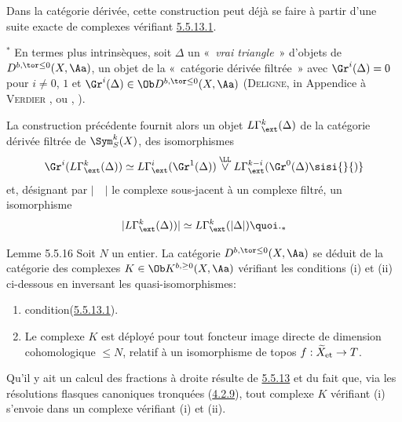 Dans la catégorie dérivée, cette construction peut déjà se faire à
partir d'une suite exacte de complexes vérifiant \hyperref[XVII.par5.5.13.1]{5.5.13.1}.

${}^{\ast}$ En termes plus intrinsèques, soit $\Delta$ un « \emph{vrai triangle} »  d'objets de $D^{b,\tor\leq
0}(X,\Aa)$, \ie un objet de la « catégorie dérivée filtrée » avec $\Gr^{i}(\Delta)=0$ pour $i\neq 0$, $1$ et $\Gr^{i}(\Delta)\in
\Ob D^{b,\tor\leq 0}(X,\Aa)$ (\textsc{Deligne}, in Appendice à \textsc{Verdier}
\cite{V2}, ou , ).

La construction précédente fournit alors un objet
$L\Gamma^{k}_{\ext}(\Delta)$ de la catégorie dérivée filtrée de
$\Sym^{k}_{S}(X)$, des isomorphismes
\[
\Gr^{i}(L\Gamma^{k}_{\ext}(\Delta))\simeq
L\Gamma^{i}_{\ext}(\Gr^{1}(\Delta))\overset{\LL}{\vee}L\Gamma^{k-i}_{\ext}
(\Gr^{0}(\Delta)\sisi{}{)}
\]
et, désignant par $\lvert\quad \rvert$ le complexe sous-jacent à un
complexe filtré, un isomorphisme
\[
\lvert L\Gamma^{k}_{\ext}(\Delta))\rvert \simeq L\Gamma^{k}_{\ext}(\lvert\Delta
\rvert){\quoi}.{}_{\ast}
\]

\begin{enonce*}{Lemme 5.5.16}
Soit $N$ un entier. La catégorie $D^{b,\tor\leq 0}(X,\Aa)$ se
déduit de la catégorie des complexes $K\in \Ob K^{b,\geq
0}(X,\Aa)$ vérifiant les conditions {\rm (i)} et {\rm (ii)}
ci-dessous en inversant les quasi-isomorphismes:
\begin{enumerate}
\renewcommand{\theenumi}{\roman{enumi}}
\renewcommand{\labelenumi}{(\theenumi)}
\item condition\pageoriginale (\hyperref[XVII.par5.5.13.1]{5.5.13.1}).

\item Le complexe $K$ est déployé pour tout foncteur image directe de
dimension cohomologique $\leq N$, relatif à un isomorphisme de topos
$f:\widetilde{X}_{\text{\rm et}}\rightarrow T$.
\end{enumerate}
\end{enonce*}

Qu'il y ait un calcul des fractions à droite résulte de \hyperref[XVII.subsubsec5.5.13]{5.5.13} et du
fait que, via les résolutions flasques canoniques tronquées (\hyperref[XVII.subsubsec4.2.9]{4.2.9}),
tout complexe $K$ vérifiant (i) s'envoie dans un complexe vérifiant
(i) et (ii).

\setcounter{subsubsection}{16}

